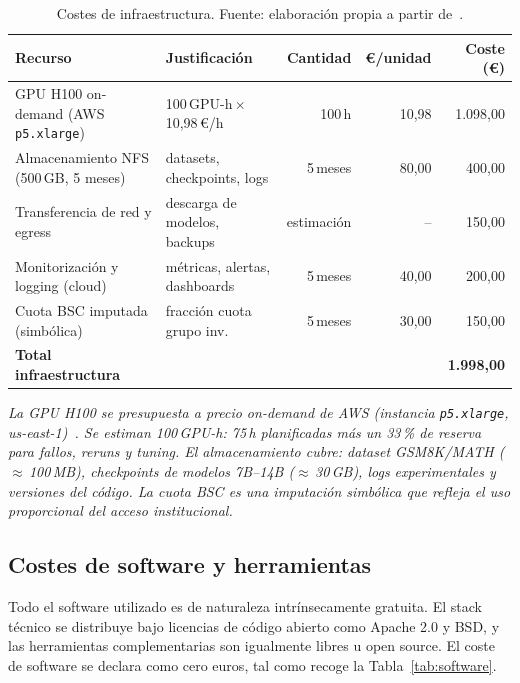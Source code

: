 \documentclass[11pt,a4paper]{article}
\begin{document}
\begin{table}[H]
\centering
\caption{Costes de infraestructura. Fuente: elaboración propia a partir de~\cite{lambda2026,aws2026}.}
\label{tab:infraestructura}
\footnotesize
\begin{tabular}{l l r r r}
\toprule
\textbf{Recurso} & \textbf{Justificación} & \textbf{Cantidad} & \textbf{\euro{}/unidad} & \textbf{Coste (\euro{})} \\
\midrule
GPU H100 on-demand (AWS \texttt{p5.xlarge})  & 100\,GPU-h\,$\times$\,10,98\,\euro{}/h~\cite{aws2026} & 100\,h & 10,98 & 1.098,00 \\
Almacenamiento NFS (500\,GB, 5 meses)        & datasets, checkpoints, logs    & 5\,meses & 80,00 & 400,00 \\
Transferencia de red y egress                & descarga de modelos, backups   & estimación & -- & 150,00 \\
Monitorización y logging (cloud)             & métricas, alertas, dashboards  & 5\,meses & 40,00 & 200,00 \\
Cuota BSC imputada (simbólica)               & fracción cuota grupo inv.      & 5\,meses & 30,00 & 150,00 \\
\midrule
\textbf{Total infraestructura} & & & & \textbf{1.998,00} \\
\bottomrule
\end{tabular}
\end{table}

\noindent\textit{\scriptsize La GPU H100 se presupuesta a precio on-demand de AWS (instancia \texttt{p5.xlarge}, us-east-1)~\cite{aws2026}. Se estiman 100\,GPU-h: 75\,h planificadas más un 33\,\% de reserva para fallos, reruns y tuning. El almacenamiento cubre: dataset GSM8K/MATH ($\approx$\,100\,MB), checkpoints de modelos 7B--14B ($\approx$\,30\,GB), logs experimentales y versiones del código. La cuota BSC es una imputación simbólica que refleja el uso proporcional del acceso institucional.}

\subsection{Costes de software y herramientas}

Todo el software utilizado es de naturaleza intrínsecamente gratuita. El stack técnico se distribuye bajo licencias de código abierto como Apache 2.0 y BSD, y las herramientas complementarias son igualmente libres u open source. El coste de software se declara como cero euros, tal como recoge la Tabla~\ref{tab:software}.
\end{document}
